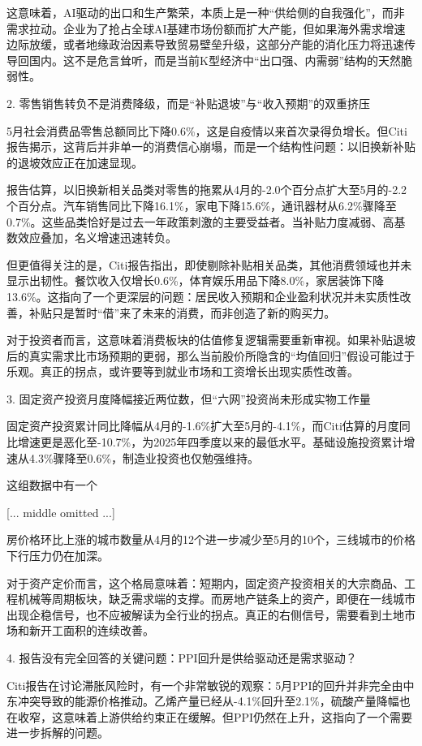 \documentclass[11pt]{ctexart}
\begin{document}
这意味着，AI驱动的出口和生产繁荣，本质上是一种“供给侧的自我强化”，而非需求拉动。企业为了抢占全球AI基建市场份额而扩大产能，但如果海外需求增速边际放缓，或者地缘政治因素导致贸易壁垒升级，这部分产能的消化压力将迅速传导回国内。这不是危言耸听，而是当前K型经济中“出口强、内需弱”结构的天然脆弱性。

2. 零售销售转负不是消费降级，而是“补贴退坡”与“收入预期”的双重挤压

5月社会消费品零售总额同比下降0.6\%，这是自疫情以来首次录得负增长。但Citi报告揭示，这背后并非单一的消费信心崩塌，而是一个结构性问题：以旧换新补贴的退坡效应正在加速显现。

报告估算，以旧换新相关品类对零售的拖累从4月的-2.0个百分点扩大至5月的-2.2个百分点。汽车销售同比下降16.1\%，家电下降15.6\%，通讯器材从6.2\%骤降至0.7\%。这些品类恰好是过去一年政策刺激的主要受益者。当补贴力度减弱、高基数效应叠加，名义增速迅速转负。

但更值得关注的是，Citi报告指出，即使剔除补贴相关品类，其他消费领域也并未显示出韧性。餐饮收入仅增长0.6\%，体育娱乐用品下降8.0\%，家居装饰下降13.6\%。这指向了一个更深层的问题：居民收入预期和企业盈利状况并未实质性改善，补贴只是暂时“借”来了未来的消费，而非创造了新的购买力。

对于投资者而言，这意味着消费板块的估值修复逻辑需要重新审视。如果补贴退坡后的真实需求比市场预期的更弱，那么当前股价所隐含的“均值回归”假设可能过于乐观。真正的拐点，或许要等到就业市场和工资增长出现实质性改善。

3. 固定资产投资月度降幅接近两位数，但“六网”投资尚未形成实物工作量

固定资产投资累计同比降幅从4月的-1.6\%扩大至5月的-4.1\%，而Citi估算的月度同比增速更是恶化至-10.7\%，为2025年四季度以来的最低水平。基础设施投资累计增速从4.3\%骤降至0.6\%，制造业投资也仅勉强维持。

这组数据中有一个

[... middle omitted ...]

房价格环比上涨的城市数量从4月的12个进一步减少至5月的10个，三线城市的价格下行压力仍在加深。

对于资产定价而言，这个格局意味着：短期内，固定资产投资相关的大宗商品、工程机械等周期板块，缺乏需求端的支撑。而房地产链条上的资产，即便在一线城市出现企稳信号，也不应被解读为全行业的拐点。真正的右侧信号，需要看到土地市场和新开工面积的连续改善。

4. 报告没有完全回答的关键问题：PPI回升是供给驱动还是需求驱动？

Citi报告在讨论滞胀风险时，有一个非常敏锐的观察：5月PPI的回升并非完全由中东冲突导致的能源价格推动。乙烯产量已经从-4.1\%回升至2.1\%，硫酸产量降幅也在收窄，这意味着上游供给约束正在缓解。但PPI仍然在上升，这指向了一个需要进一步拆解的问题。
\end{document}
